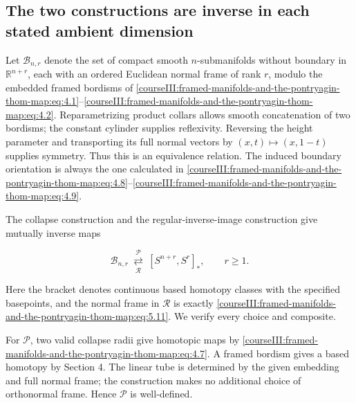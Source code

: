 \label{courseIII:framed-manifolds-and-the-pontryagin-thom-map:pt-bijection}

\subsection{The two constructions are inverse in each stated ambient dimension}
\label{courseIII:framed-manifolds-and-the-pontryagin-thom-map:section-7}

\label{courseIII:pontryagin-thom:7}

Let \(\mathcal B_{n,r}\) denote the set of compact smooth \(n\)-submanifolds without boundary in \(\mathbb R^{n+r}\), each with an ordered Euclidean normal frame of rank \(r\), modulo the embedded framed bordisms of \eqref{courseIII:framed-manifolds-and-the-pontryagin-thom-map:eq:4.1}--\eqref{courseIII:framed-manifolds-and-the-pontryagin-thom-map:eq:4.2}. Reparametrizing product collars allows smooth concatenation of two bordisms; the constant cylinder supplies reflexivity. Reversing the height parameter and transporting its full normal vectors by \((x,t)\mapsto(x,1-t)\) supplies symmetry. Thus this is an equivalence relation. The induced boundary orientation is always the one calculated in \eqref{courseIII:framed-manifolds-and-the-pontryagin-thom-map:eq:4.8}--\eqref{courseIII:framed-manifolds-and-the-pontryagin-thom-map:eq:4.9}.

The collapse construction and the regular-inverse-image construction give mutually inverse maps

\begin{equation}
\mathcal B_{n,r}\ \underset{\mathcal R}{\overset{\mathcal P}{\rightleftarrows}}\
                  [S^{n+r},S^r]_* ,\qquad r\geq1.
 \label{courseIII:framed-manifolds-and-the-pontryagin-thom-map:eq:7.1}
\end{equation}

Here the bracket denotes continuous based homotopy classes with the specified basepoints, and the normal frame in \(\mathcal R\) is exactly \eqref{courseIII:framed-manifolds-and-the-pontryagin-thom-map:eq:5.11}. We verify every choice and composite.

For \(\mathcal P\), two valid collapse radii give homotopic maps by \eqref{courseIII:framed-manifolds-and-the-pontryagin-thom-map:eq:4.7}. A framed bordism gives a based homotopy by Section 4. The linear tube is determined by the given embedding and full normal frame; the construction makes no additional choice of orthonormal frame. Hence \(\mathcal P\) is well-defined.

